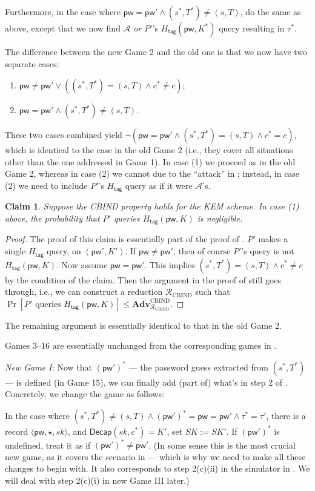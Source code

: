 \documentclass{article}
\theoremstyle{plain}
\newtheorem{claim}{Claim}
\theoremstyle{definition}
\theoremstyle{remark}
\newcommand{\adv}{\mathcal{A}}
\newcommand{\red}{\mathcal{R}}
\newcommand{\Adv}{\mathbf{Adv}}
\newcommand{\Decap}{\mathsf{Decap}}
\newcommand{\Htag}{H_\mathsf{tag}}
\newcommand{\pw}{\mathsf{pw}}
\begin{document}
Furthermore, in the case where $\pw = \pw' \land (s^*,T^*) \neq (s,T)$, do the same as above, except that we now find $\adv$ \emph{or $P'$}'s $\Htag(\pw,K^*)$ query resulting in $\tau^*$.

The difference between the new Game 2 and the old one is that we now have two separate cases:
\begin{enumerate}
  \item $\pw \neq \pw' \lor ((s^*,T^*) = (s,T) \land c^* \neq c)$;
  \item $\pw = \pw' \land (s^*,T^*) \neq (s,T)$.
\end{enumerate}
These two cases combined yield $\neg(\pw = \pw' \land (s^*,T^*) = (s,T) \land c^* = c)$, which is identical to the case in the old Game 2 (i.e., they cover all situations other than the one addressed in Game 1). In case (1) we proceed as in the old Game 2, whereas in case (2) we cannot due to the ``attack'' in ; instead, in case (2) we need to include $P'$'s $\Htag$ query as if it were $\adv$'s.

\begin{claim}
\label{clm:htag6}
Suppose the CBIND property holds for the KEM scheme. In case (1) above, the probability that $P'$ queries $\Htag(\pw,K)$ is negligible.
\end{claim}
\begin{proof}
The proof of this claim is essentially part of the proof of . $P'$ makes a single $\Htag$ query, on $(\pw',K')$. If $\pw \neq \pw'$, then of course $P'$'s query is not $\Htag(\pw,K)$. Now assume $\pw = \pw'$. This implies $(s^*,T^*) = (s,T) \land c^* \neq c$ by the condition of the claim. Then the argument in the proof of  still goes through, i.e., we can construct a reduction $\red_\text{CBIND}$ such that $\Pr[P'\text{ queries }\Htag(\pw,K)] \leq \Adv_{\red_\text{CBIND}}^\text{CBIND}$.
\end{proof}
The remaining argument is essentially identical to that in the old Game 2.

\medskip
Games 3--16 are essentially unchanged from the corresponding games in .

\medskip\noindent\emph{New Game I:} Now that $(\pw')^*$ --- the password guess extracted from $(s^*,T^*)$ --- is defined (in Game 15), we can finally add (part of) what's in step 2 of . Concretely, we change the game as follows:

In the case where $(s^*,T^*) \neq (s,T) \land (\pw')^* = \pw = \pw' \land \tau^* = \tau'$, there is a record $\langle\pw,\star,sk\rangle$, and $\Decap(sk,c^*) = K'$, set $SK := SK'$. If $(\pw')^*$ is undefined, treat it as if $(\pw')^* \neq \pw'$. (In some sense this is the most crucial new game, as it covers the scenario in  --- which is why we need to make all these changes to begin with. It also corresponds to step 2(c)(ii) in the simulator in . We will deal with step 2(c)(i) in new Game III later.)
\end{document}
